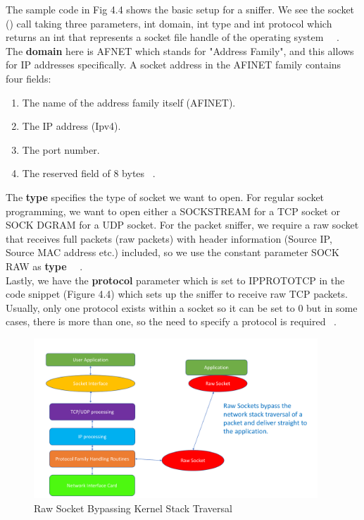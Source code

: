 The sample code in Fig 4.4 shows the basic setup for a sniffer. We see the socket () call taking three parameters, int domain, int type and int protocol which returns an int that represents a socket file handle of the operating system ~\cite{35}~\cite{38}. \\

The \textbf{domain} here is AF\textunderscore NET which stands for "Address Family", and this allows for IP addresses specifically. 
A socket address in the AF\textunderscore INET family contains four fields: 

\begin{enumerate}
     \item The name of the address family itself (AF\textunderscore INET).
     \item The IP address (Ipv4).
     \item The port number.
     \item The reserved field of 8 bytes ~\cite{36}. \\
\end{enumerate}

The \textbf{type} specifies the type of socket we want to open. For regular socket programming, we want to open either a SOCK\textunderscore STREAM for a TCP socket or SOCK \textunderscore DGRAM for a UDP socket. For the packet sniffer, we require a raw socket that receives full packets (raw packets) with header information (Source IP, Source MAC address etc.) included, so we use the constant parameter SOCK \textunderscore RAW as  \textbf{type} ~\cite{36}~\cite{38}. \\

Lastly, we have the \textbf{protocol} parameter which is set to IPPROTO\textunderscore TCP in the code snippet (Figure 4.4) which sets up the sniffer to receive raw TCP packets. Usually, only one protocol exists within a socket so it can be set to 0 but in some cases, there is more than one, so the need to specify a protocol is required ~\cite{35}.\\

\begin{figure}[h!]
    \centering
    \includegraphics[width=0.95\textwidth]{stackTraversal.pdf}
    \caption{Raw Socket Bypassing Kernel Stack Traversal}
    \label{RawSocketTraversal}
\end{figure}

